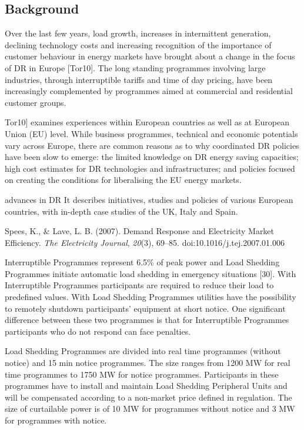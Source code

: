 \documentclass{llncs}
\begin{document}
\subsection{Background}

Over the last few years, load growth, increases in intermittent generation,
declining technology costs and increasing recognition of the importance of
customer behaviour in energy markets have brought about a change in the
focus of DR in Europe [Tor10]. The long standing programmes involving large
industries, through interruptible tariffs and time of day pricing, have been
increasingly complemented by programmes aimed at commercial and residential
customer groups.

\cite{torriti_demand_2010} Tor10] examines experiences within European countries as well as at
European Union (EU) level. While business programmes, technical and economic
potentials vary across Europe, there are common reasons as to why
coordinated DR policies have been slow to emerge: the limited knowledge on
DR energy saving capacities; high cost estimates for DR technologies and
infrastructures; and policies focused on creating the conditions for
liberalising the EU energy markets.


advances in DR It describes initiatives, studies and policies of various
European countries, with in-depth case studies of the UK, Italy and Spain.

Spees, K., {\&} Lave, L. B. (2007). Demand Response and Electricity Market
Efficiency. \textit{The Electricity Journal}, \textit{20}(3), 69--85. doi:10.1016/j.tej.2007.01.006

Interruptible Programmes represent 6.5{\%} of peak power and Load Shedding
Programmes initiate automatic load shedding in emergency situations [30].
With Interruptible Programmes participants are required to reduce their load
to predefined values. With Load Shedding Programmes utilities have the
possibility to remotely shutdown participants' equipment at short notice.
One significant difference between these two programmes is that for
Interruptible Programmes participants who do not respond can face penalties.

Load Shedding Programmes are divided into real time programmes (without
notice) and 15 min notice programmes. The size ranges from 1200 MW for real
time programmes to 1750 MW for notice programmes. Participants in these
programmes have to install and maintain Load Shedding Peripheral Units and
will be compensated according to a non-market price defined in regulation.
The size of curtailable power is of 10 MW for programmes without notice and
3 MW for programmes with notice.
\end{document}
